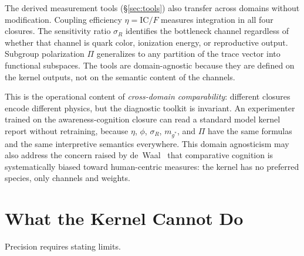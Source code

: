 \documentclass[
  aps,
  prd,
  twocolumn,
  superscriptaddress,
  nofootinbib,
  floatfix
]{revtex4-2}
\newcommand{\IC}{\mathrm{IC}}
\begin{document}
The derived measurement tools (\S\ref{sec:tools}) also
transfer across domains without modification.  Coupling
efficiency $\eta = \IC/F$ measures integration in
all four closures.  The sensitivity ratio $\sigma_R$
identifies the bottleneck channel regardless of whether
that channel is quark color, ionization energy, or
reproductive output.  Subgroup polarization $\Pi$
generalizes to any partition of the trace vector into
functional subspaces.  The tools are domain-agnostic
because they are defined on the kernel outputs, not
on the semantic content of the channels.

This is the operational content of \emph{cross-domain
comparability}: different closures encode different
physics, but the diagnostic toolkit is invariant.  An
experimenter trained on the awareness-cognition closure
can read a standard model kernel report without
retraining, because $\eta$, $\phi$, $\sigma_R$,
$m_{g^*}$, and $\Pi$ have the same formulas and the
same interpretive semantics everywhere.  This domain
agnosticism may also address the concern raised by
de~Waal~\cite{deWaal2016animals} that comparative
cognition is systematically biased toward human-centric
measures: the kernel has no preferred species, only
channels and weights.

\section{What the Kernel Cannot Do}\label{sec:limits}

Precision requires stating limits.
\end{document}
